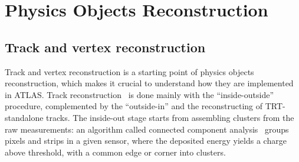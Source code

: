 
\chapter{Physics Objects Reconstruction}
\section{Track and vertex reconstruction}
\large
\label{sec:track}
Track and vertex reconstruction is a starting point of physics objects reconstruction, 
which makes it crucial to understand how they are implemented in ATLAS.
Track reconstruction~\cite{ATLAS-CONF-2012-042,PERF-2015-08} is done 
mainly with the ``inside-outside'' procedure, complemented by the ``outside-in'' 
and the reconstructing of TRT-standalone tracks. 
The inside-out stage starts from assembling clusters from the raw measurements:
an algorithm called connected component analysis~\cite{CCA} 
groups pixels and strips in a given sensor, 
where the deposited energy yields a charge above threshold, 
with a common edge or corner into clusters. 
    
